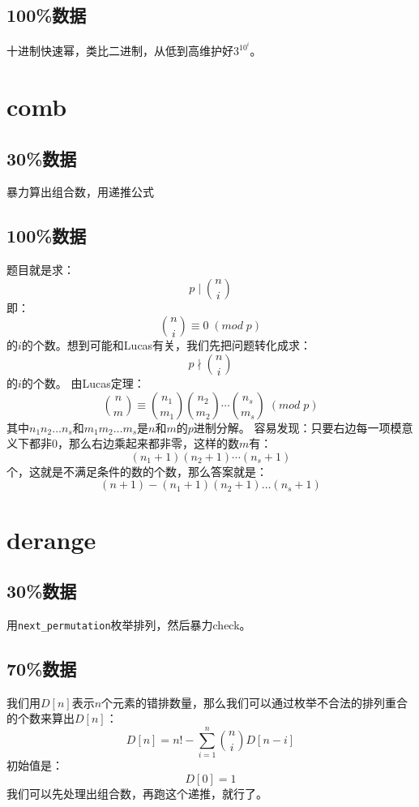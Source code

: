 \documentclass{article}
\begin{document}
		\subsection{100\%数据}
			十进制快速幂，类比二进制，从低到高维护好$3^{10^{i}}$。
		
		\newpage
		
	\section{comb}
		\subsection{30\%数据}
			暴力算出组合数，用递推公式
			
		\subsection{100\%数据}
			题目就是求：
			$$
				p \mid \binom{n}{i}
			$$
			即：
			$$
				\binom{n}{i} \equiv 0 \; ( mod \; p )
			$$
			的$i$的个数。想到可能和Lucas有关，我们先把问题转化成求：
			$$
				p \nmid \binom{n}{i}
			$$
			的$i$的个数。
			由Lucas定理：
			$$
				\binom{n}{m} \equiv \binom{n_1}{m_1}\binom{n_2}{m_2}\cdots\binom{n_s}{m_s}  \; ( mod \; p )
			$$
			其中$n_1n_2\dots n_s$和$m_1m_2\dots m_s$是$n$和$m$的$p$进制分解。
			容易发现：只要右边每一项模意义下都非$0$，那么右边乘起来都非零，这样的数$m$有：
			$$
				(n_1+1)(n_2+1)\cdots(n_s+1)
			$$
			个，这就是不满足条件的数的个数，那么答案就是：
			$$
				(n + 1) - (n_1+1)(n_2+1)\dots(n_s+1)
			$$
			\newpage
	\section{derange}
		\subsection{30\%数据}
			用\verb|next_permutation|枚举排列，然后暴力check。
		
		\subsection{70\%数据}
			
			我们用$D[n]$表示$n$个元素的错排数量，那么我们可以通过枚举不合法的排列重合的个数来算出$D[n]$：
			$$
				D[n] = n! - \sum_{i = 1}^{n} \binom{n}{i}D[n-i]
			$$
			初始值是：
			$$
				D[0] = 1
			$$
			我们可以先处理出组合数，再跑这个递推，就行了。
			
\end{document}

